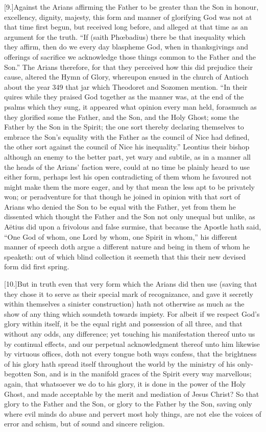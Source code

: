 [9.]Against the Arians affirming the Father to be greater than the Son in honour, excellency, dignity, majesty, this form and manner of glorifying God was not at that time first begun, but received long before, and alleged at that time as an argument for the truth. “If (saith Phœbadius) there be that inequality which they affirm, then do we every day blaspheme God, when in thanksgivings and offerings of sacrifice we acknowledge those things common to the Father and the Son.” The Arians therefore, for that they perceived how this did prejudice their cause, altered the Hymn of Glory, whereupon ensued in the church of Antioch about the year 349 that jar which Theodoret and Sozomen mention. “In their quires while they praised  God together as the manner was,
 at the end of the psalms which they sung, it appeared what opinion every man held, forasmuch as they glorified some the Father, and the Son, and the Holy Ghost; some the Father by the Son in the Spirit; the one sort thereby declaring themselves to embrace the Son’s equality with the Father as the council of Nice had defined, the other sort against the council of Nice his inequality.” Leontius their bishop although an enemy to the better part, yet wary and subtile, as in a manner all the heads of the Arians’ faction were, could at no time be plainly heard to use either form, perhaps lest his open contradicting of them whom he favoured not might make them the more eager, and by that mean the less apt to be privately won; or peradventure for that though he joined in opinion with that sort of Arians who denied the Son to be equal with the Father, yet from them he dissented which thought the Father and the Son not only unequal but unlike, as Aëtius did upon a frivolous and false surmise, that because the Apostle hath said, “One God of whom, one Lord by whom, one Spirit in whom,” his different manner of speech doth argue a different nature and being in them of whom he speaketh: out of which blind collection it seemeth that this their new devised form did first spring.

[10.]But in truth even that very form which the Arians did then use (saving that they chose it to serve as their special mark of recognizance, and gave it secretly within themselves a sinister construction) hath not otherwise as much as the show of any thing which soundeth towards impiety. For albeit if we respect God’s glory within itself, it be the equal right and possession of all three, and that without any odds, any difference; yet touching his manifestation thereof unto us by continual effects, and our perpetual acknowledgment  thereof unto him likewise by virtuous offices, doth not every tongue both ways confess,
 that the brightness of his glory hath spread itself throughout the world by the ministry of his only-begotten Son, and is in the manifold graces of the Spirit every way marvellous; again, that whatsoever we do to his glory, it is done in the power of the Holy Ghost, and made acceptable by the merit and mediation of Jesus Christ? So that glory to the Father and the Son, or glory to the Father by the Son, saving only where evil minds do abuse and pervert most holy things, are not else the voices of error and schism, but of sound and sincere religion.

